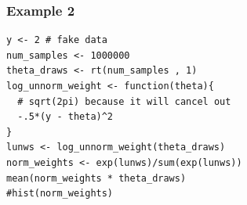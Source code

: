 \documentclass{beamer}
\begin{document}
\begin{frame}[fragile]
\frametitle{Example 2}


\begin{verbatim}
y <- 2 # fake data
num_samples <- 1000000
theta_draws <- rt(num_samples , 1)
log_unnorm_weight <- function(theta){ 
  # sqrt(2pi) because it will cancel out 
  -.5*(y - theta)^2
}
lunws <- log_unnorm_weight(theta_draws)
norm_weights <- exp(lunws)/sum(exp(lunws))
mean(norm_weights * theta_draws)
#hist(norm_weights)
\end{verbatim}


\end{frame}


% 
% 
% 
% 
% 
% 
% 
% 
% 
% 
\end{document}

